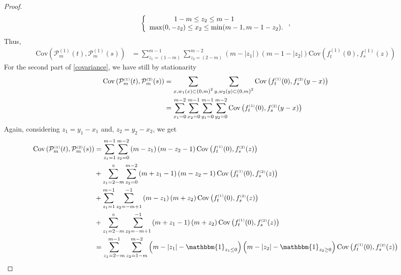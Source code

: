 \documentclass[12pt]{article}
\theoremstyle{Theorem}
\begin{document}
\begin{proof}
\begin{align*}
\left\{
\begin{array}{rcl}
1-m \leq z_2 \leq m-1 \hspace{2.5cm}  \\
\max(0, -z_2) \leq x_2 \leq \min(m-1 , m-1-z_2).
\end{array}\right., 
\end{align*}
Thus,
\begin{align*}
\text{Cov}\left(\mathcal{P}_{m}^{\scriptscriptstyle (1)}(t),\mathcal{P}_{m}^{\scriptscriptstyle (1)}(s) \right) &  = \sum_{z_{\scriptscriptstyle 1} = \left(1-m\right)}^{m-1}\sum_{z_{\scriptscriptstyle 2}=\left(2-m\right)}^{m-2}\left(m -|z_{1}|\right)\left(m - 1- |z_{2}|\right) \text{Cov}\left(f_{t}^{\scriptscriptstyle (1)}(0), f_{s}^{\scriptscriptstyle (1)}(z) \right) 
\end{align*}
For the second part of \eqref{covariance}, we have still by stationarity
\begin{align*}
\text{Cov}\left(\mathcal{P}_{m}^{\scriptscriptstyle (1)}(t),\mathcal{P}_{m}^{\scriptscriptstyle (2)}(s) \right) & = \sum_{x, w_{1}(x) \subset \text{\larger[1]{$($}}0, m \text{\larger[1]{$)$}}^{2}} \sum_{y, w_{2}(y) \subset \text{\larger[1]{$($}}0, m \text{\larger[1]{$)$}}^{2}} \text{Cov}\left(f_{t}^{\scriptscriptstyle (1)}(0), f_{s}^{ \scriptscriptstyle (2)}(y-x) \right)\\
& =  \sum_{x_1 = 0}^{m-2}\sum_{x_2 = 0}^{m-1}\sum_{y_1 = 0}^{m-1}\sum_{y_2 = 0}^{m-2}\text{Cov}\left(f_{t}^{\scriptscriptstyle (1)}(0), f_{s}^{ \scriptscriptstyle (2)}(y-x) \right)
\end{align*}
Again, considering $z_1 = y_1 - x_1$ and, $z_{2} = y_{2}-x_{2}$, we get
\begin{align*}
\text{Cov}\left(\mathcal{P}_{m}^{\scriptscriptstyle (1)}(t),\mathcal{P}_{m}^{\scriptscriptstyle (2)}(s) \right) & = \sum_{z_1=1}^{m-1}\sum_{z_2 = 0}^{m-2}\left(m-z_1\right)\left(m-z_2-1\right)\text{Cov}\left(f_{t}^{\scriptscriptstyle (1)}(0), f_{s}^{ \scriptscriptstyle (2)}(z) \right)\\
& +  \sum_{z_1=2-m}^{\scriptscriptstyle 0}\sum_{z_2 = 0}^{m-2}\left(m+z_1-1\right)\left(m-z_2-1\right)\text{Cov}\left(f_{t}^{\scriptscriptstyle (1)}(0), f_{s}^{ \scriptscriptstyle (2)}(z) \right)\\
& +  \sum_{z_1=1}^{m-1}\sum_{z_2 = -m+1}^{-1}\left(m-z_1\right)\left(m+z_2\right)\text{Cov}\left(f_{t}^{\scriptscriptstyle (1)}(0), f_{s}^{ \scriptscriptstyle (2)}(z) \right)\\
& + \sum_{z_1=2-m}^{\scriptscriptstyle 0}\sum_{z_2 = -m+1}^{-1} \left(m+z_1-1\right)\left(m+z_2\right)\text{Cov}\left(f_{t}^{\scriptscriptstyle (1)}(0), f_{s}^{ \scriptscriptstyle (2)}(z) \right) \\
& = \sum_{z_1=2-m}^{m-1} \sum_{z_2 = 1-m}^{m-2} \left(m-|z_1| - \mathbbm{1}_{z_{1} \leq 0}\right)\left(m-|z_2|-\mathbbm{1}_{z_{2} \geq 0}\right)\text{Cov}\left(f_{t}^{\scriptscriptstyle (1)}(0), f_{s}^{ \scriptscriptstyle (2)}(z) \right)
\end{align*}
\end{proof}
\end{document}
